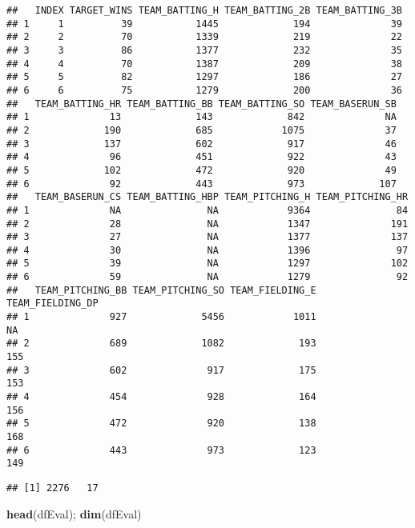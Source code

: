 \documentclass[
]{article}
\newenvironment{Shaded}{\begin{snugshade}}{\end{snugshade}}
\newcommand{\KeywordTok}[1]{\textcolor[rgb]{0.13,0.29,0.53}{\textbf{#1}}}
\newcommand{\NormalTok}[1]{#1}
\begin{document}
\begin{verbatim}
##   INDEX TARGET_WINS TEAM_BATTING_H TEAM_BATTING_2B TEAM_BATTING_3B
## 1     1          39           1445             194              39
## 2     2          70           1339             219              22
## 3     3          86           1377             232              35
## 4     4          70           1387             209              38
## 5     5          82           1297             186              27
## 6     6          75           1279             200              36
##   TEAM_BATTING_HR TEAM_BATTING_BB TEAM_BATTING_SO TEAM_BASERUN_SB
## 1              13             143             842              NA
## 2             190             685            1075              37
## 3             137             602             917              46
## 4              96             451             922              43
## 5             102             472             920              49
## 6              92             443             973             107
##   TEAM_BASERUN_CS TEAM_BATTING_HBP TEAM_PITCHING_H TEAM_PITCHING_HR
## 1              NA               NA            9364               84
## 2              28               NA            1347              191
## 3              27               NA            1377              137
## 4              30               NA            1396               97
## 5              39               NA            1297              102
## 6              59               NA            1279               92
##   TEAM_PITCHING_BB TEAM_PITCHING_SO TEAM_FIELDING_E TEAM_FIELDING_DP
## 1              927             5456            1011               NA
## 2              689             1082             193              155
## 3              602              917             175              153
## 4              454              928             164              156
## 5              472              920             138              168
## 6              443              973             123              149
\end{verbatim}

\begin{verbatim}
## [1] 2276   17
\end{verbatim}

\begin{Shaded}
\begin{Highlighting}[]
\KeywordTok{head}\NormalTok{(dfEval); }\KeywordTok{dim}\NormalTok{(dfEval)}
\end{Highlighting}
\end{Shaded}
\end{document}
